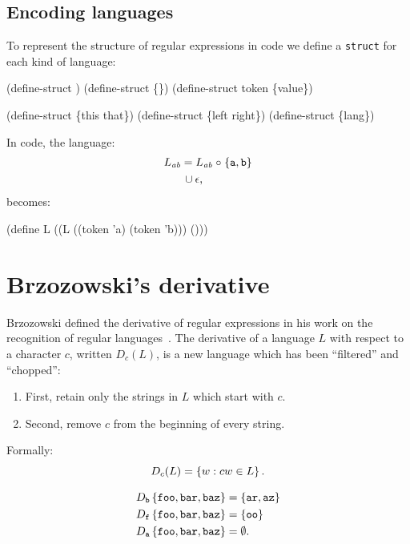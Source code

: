 \subsection{Encoding languages}
To represent the structure of regular expressions in code we define a
\texttt{struct} for each kind of language:
\begin{code}
(define-struct \ttempty     \ttlb\ttrb)        
(define-struct \ttepsilon     \{\})   
(define-struct token \{value\})    

(define-struct \ttcup     \{this that\}) 
(define-struct \ttcirc     \{left right\})
(define-struct \ttstar     \{lang\})\end{code}


\begin{example}
%
In code, the language:
\begin{align*}
 L_{\mathit{ab}} &= L_{\mathit{ab}} \mathrel{\circ} \left\{{\tt a}, {\tt b}\right\} 
 \\
 &\,\cup \epsilon
 \text,
\end{align*}
becomes:
\begin{code}
(define L (\ttcup (\ttcirc L (\ttcup (token 'a) (token 'b)))
             (\ttepsilon)))\end{code}
\end{example}


\section{Brzozowski's derivative}
%
Brzozowski defined the derivative of regular expressions in his work
on the recognition of regular languages~\cite{mattmight:Brzozowski:1964:Derivative}.
%
The derivative of a language $L$ with respect to a character $c$, written
$D_c(L)$, is a new language which has been ``filtered'' and ``chopped'':
\begin{enumerate}

\item
First, retain only the strings in $L$ which start with $c$.

\item
Second, remove $c$ from the beginning of every string.

\end{enumerate}
%
Formally:
\begin{equation*}
  D_c(L) = 
  \left\{  w  :  cw \in L \right\}
  \text.
\end{equation*}
%

\begin{example}
\begin{align*}
  &D_{\tt b}\left\{{\tt foo}, {\tt bar}, {\tt baz}\right\} = \left\{{\tt ar}, {\tt az}\right\}
  \\
  &D_{\tt f}\left\{{\tt foo}, {\tt bar}, {\tt baz}\right\} = \left\{{\tt oo}\right\}
  \\
  &D_{\tt a}\left\{{\tt foo}, {\tt bar}, {\tt baz}\right\} = \emptyset
  \text.
\end{align*}
\end{example}


